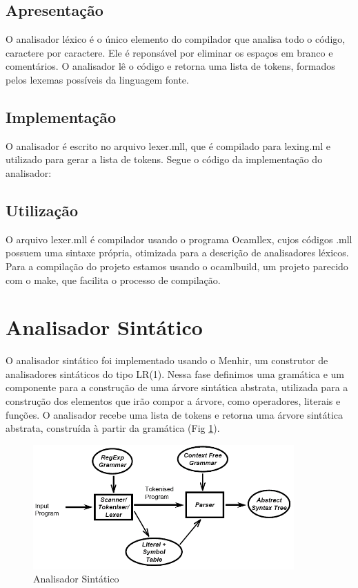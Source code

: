\documentclass[12pt,a4paper,twoside]{report}
\begin{document}
\subsection{Apresentação}
O analisador léxico é o único elemento do compilador que analisa todo o código, caractere por caractere.
Ele é reponsável por eliminar os espaços em branco e comentários. O analisador lê o código e retorna uma
lista de tokens, formados pelos lexemas possíveis da linguagem fonte.

\subsection{Implementação}

O analisador é escrito no arquivo lexer.mll, que é compilado para lexing.ml e utilizado para gerar a lista de tokens.
Segue o código da implementação do analisador:



\subsection{Utilização}

O arquivo lexer.mll é compilador usando o programa Ocamllex, cujos códigos .mll possuem uma sintaxe
própria, otimizada para a descrição de analisadores léxicos. Para a compilação do projeto estamos usando o ocamlbuild, um projeto
parecido com o make, que facilita o processo de compilação. 

\section{Analisador Sintático}

O analisador sintático foi implementado usando o Menhir, um construtor de analisadores sintáticos do tipo LR(1). Nessa fase definimos
uma gramática e um componente para a construção de uma árvore sintática abstrata, utilizada para a construção dos elementos que irão compor a árvore, como operadores, literais e funções. O analisador recebe uma lista de tokens e retorna uma árvore sintática abstrata, construída à partir da gramática
(Fig \ref{fig:parsing}).

\begin{figure}[h]
	\centering
	\includegraphics[width=10cm]{imagens/parsing}
	\caption{Analisador Sintático}
	\label{fig:parsing}
\end{figure}
\end{document}

